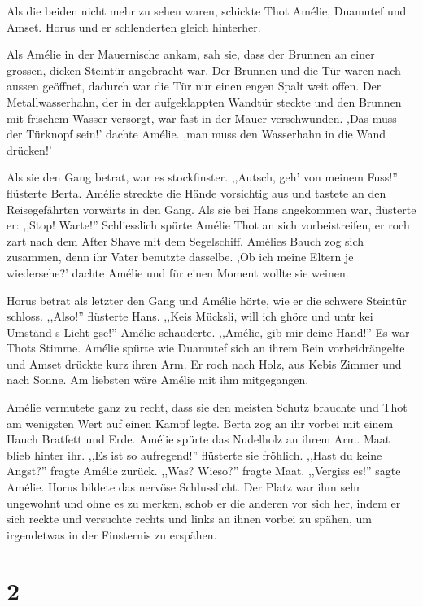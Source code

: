 \documentclass[11pt,titlepage,a5paper]{book}
\begin{document}
Als die beiden nicht mehr zu sehen waren, schickte Thot Amélie, Duamutef und Amset. Horus und er schlenderten gleich hinterher. 

Als Amélie in der Mauernische ankam, sah sie, dass der Brunnen an einer grossen, dicken Steintür angebracht war. Der Brunnen und die Tür waren nach aussen geöffnet, dadurch war die Tür nur einen engen  Spalt weit offen. Der Metallwasserhahn, der in der aufgeklappten Wandtür steckte und den Brunnen mit frischem Wasser versorgt, war fast in der Mauer verschwunden. ,Das muss der Türknopf sein!' dachte Amélie. ,man muss den Wasserhahn in die Wand drücken!' 

Als sie den Gang betrat, war es stockfinster. ,,Autsch, geh' von meinem Fuss!'' flüsterte Berta. Amélie streckte die Hände vorsichtig aus und tastete an den Reisegefährten vorwärts in den Gang. Als sie bei Hans angekommen war, flüsterte er: ,,Stop! Warte!'' Schliesslich spürte Amélie Thot an sich vorbeistreifen, er roch zart nach dem After Shave mit dem Segelschiff. Amélies Bauch zog sich zusammen, denn ihr Vater benutzte dasselbe. ,Ob ich meine Eltern je wiedersehe?' dachte Amélie und für einen Moment wollte sie weinen. 

Horus betrat als letzter den Gang und Amélie hörte, wie er die schwere Steintür schloss. ,,Also!'' flüsterte Hans. ,,Keis Mücksli, will ich ghöre und untr kei Umständ s Licht gse!'' Amélie schauderte. ,,Amélie, gib mir deine Hand!'' Es war Thots Stimme. Amélie spürte wie Duamutef sich an ihrem Bein vorbeidrängelte und Amset drückte kurz ihren Arm. Er roch nach Holz, aus Kebis Zimmer und nach Sonne. Am liebsten wäre Amélie mit ihm mitgegangen.

Amélie vermutete ganz zu recht, dass sie den meisten Schutz brauchte und Thot am wenigsten Wert auf einen Kampf legte. Berta zog an ihr vorbei mit einem Hauch Bratfett und Erde. Amélie spürte das Nudelholz an ihrem Arm. Maat blieb hinter ihr. ,,Es ist so aufregend!'' flüsterte sie fröhlich. ,,Hast du keine Angst?'' fragte Amélie zurück. ,,Was? Wieso?'' fragte Maat.  ,,Vergiss es!'' sagte Amélie. Horus bildete das nervöse Schlusslicht. Der Platz war ihm sehr ungewohnt und ohne es zu merken, schob er die anderen vor sich her, indem er sich reckte und versuchte rechts und links an ihnen vorbei zu spähen, um irgendetwas in der Finsternis zu erspähen.

 \section*{2}
\end{document}
